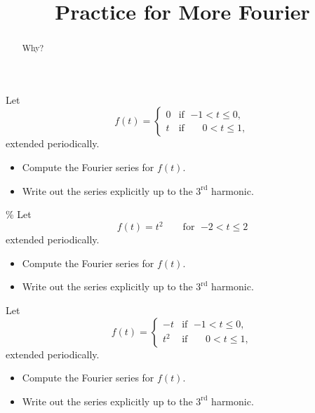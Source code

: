 \documentclass{ximera}
\title{Practice for More Fourier}
\begin{document}
\begin{abstract}
Why?
\end{abstract}
\maketitle


\begin{exercise}
    Let
    \begin{equation*}
        f(t) =
        \begin{cases}
            0 & \text{if } \; {-1} < t \leq 0 , \\
            t & \text{if } \; \phantom{-}0 < t \leq  1 ,
        \end{cases}
    \end{equation*}
    extended periodically.
    \begin{itemize}
        \item Compute the Fourier series for $f(t)$.
        \item Write out the series explicitly up to the $3^{\text{rd}}$ harmonic.
    \end{itemize}
\end{exercise}

\begin{exercise}\%
    Let
    \begin{equation*}
        f(t) = t^2 \qquad \text{for } \; {-2} < t \leq 2
    \end{equation*}
    extended periodically.
    \begin{itemize}
        \item Compute the Fourier series for $f(t)$.
        \item Write out the series explicitly up to the $3^{\text{rd}}$ harmonic.
    \end{itemize}
\end{exercise}

\begin{exercise}
    Let
    \begin{equation*}
        f(t) =
        \begin{cases}
            -t & \text{if } \; {-1} < t \leq 0 , \\
            t^2 & \text{if } \; \phantom{-}0 < t \leq  1 ,
        \end{cases}
    \end{equation*}
    extended periodically.
    \begin{itemize}
        \item Compute the Fourier series for $f(t)$.
        \item Write out the series explicitly up to the $3^{\text{rd}}$ harmonic.
    \end{itemize}
\end{exercise}
\end{document}
